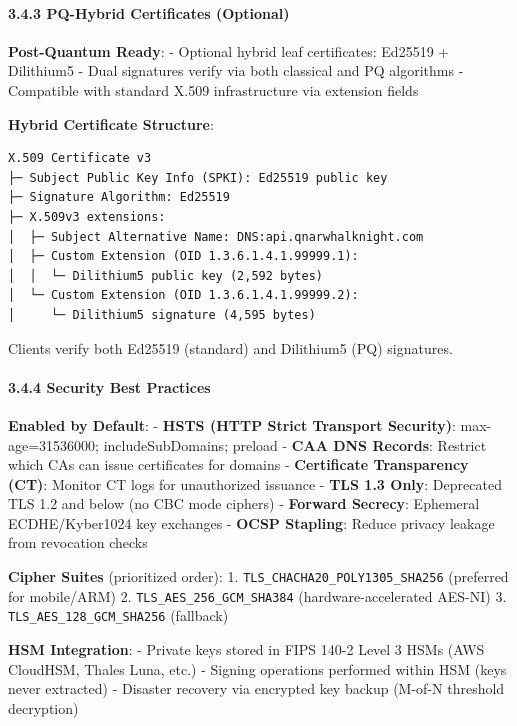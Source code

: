 \documentclass[
  11pt,
]{article}
\begin{document}
\hypertarget{pq-hybrid-certificates-optional}{%
\paragraph{3.4.3 PQ-Hybrid Certificates
(Optional)}\label{pq-hybrid-certificates-optional}}

\textbf{Post-Quantum Ready}: - Optional hybrid leaf certificates:
Ed25519 + Dilithium5 - Dual signatures verify via both classical and PQ
algorithms - Compatible with standard X.509 infrastructure via extension
fields

\textbf{Hybrid Certificate Structure}:

\begin{verbatim}
X.509 Certificate v3
├─ Subject Public Key Info (SPKI): Ed25519 public key
├─ Signature Algorithm: Ed25519
├─ X.509v3 extensions:
│  ├─ Subject Alternative Name: DNS:api.qnarwhalknight.com
│  ├─ Custom Extension (OID 1.3.6.1.4.1.99999.1):
│  │  └─ Dilithium5 public key (2,592 bytes)
│  └─ Custom Extension (OID 1.3.6.1.4.1.99999.2):
│     └─ Dilithium5 signature (4,595 bytes)
\end{verbatim}

Clients verify both Ed25519 (standard) and Dilithium5 (PQ) signatures.

\hypertarget{security-best-practices}{%
\paragraph{3.4.4 Security Best
Practices}\label{security-best-practices}}

\textbf{Enabled by Default}: - \textbf{HSTS (HTTP Strict Transport
Security)}: max-age=31536000; includeSubDomains; preload - \textbf{CAA
DNS Records}: Restrict which CAs can issue certificates for domains -
\textbf{Certificate Transparency (CT)}: Monitor CT logs for unauthorized
issuance - \textbf{TLS 1.3 Only}: Deprecated TLS 1.2 and below (no CBC
mode ciphers) - \textbf{Forward Secrecy}: Ephemeral ECDHE/Kyber1024 key
exchanges - \textbf{OCSP Stapling}: Reduce privacy leakage from
revocation checks

\textbf{Cipher Suites} (prioritized order): 1.
\texttt{TLS\_CHACHA20\_POLY1305\_SHA256} (preferred for mobile/ARM) 2.
\texttt{TLS\_AES\_256\_GCM\_SHA384} (hardware-accelerated AES-NI) 3.
\texttt{TLS\_AES\_128\_GCM\_SHA256} (fallback)

\textbf{HSM Integration}: - Private keys stored in FIPS 140-2 Level 3
HSMs (AWS CloudHSM, Thales Luna, etc.) - Signing operations performed
within HSM (keys never extracted) - Disaster recovery via encrypted key
backup (M-of-N threshold decryption)
\end{document}
